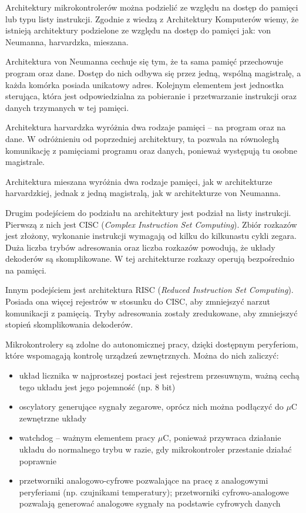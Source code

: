 Architektury mikrokontrolerów można podzielić ze względu na dostęp do pamięci lub typu listy instrukcji. Zgodnie z wiedzą z Architektury Komputerów wiemy, że istnieją architektury podzielone ze względu na dostęp do pamięci jak: von Neumanna, harvardzka, mieszana.

Architektura von Neumanna cechuje się tym, że ta sama pamięć przechowuje program oraz dane. Dostęp do nich odbywa się przez jedną, wspólną magistralę, a każda komórka posiada unikatowy adres. Kolejnym elementem jest jednostka sterująca, która jest odpowiedzialna za pobieranie i przetwarzanie instrukcji oraz danych trzymanych w tej pamięci.

Architektura harvardzka wyróżnia dwa rodzaje pamięci -- na program oraz na dane. W odróżnieniu od poprzedniej architektury, ta pozwala na równoległą komunikację z pamięciami programu oraz danych, ponieważ występują tu osobne magistrale.

Architektura mieszana wyróżnia dwa rodzaje pamięci, jak w architekturze harvardzkiej, jednak z jedną magistralą, jak w architekturze von Neumanna.

Drugim podejściem do podziału na architektury jest podział na listy instrukcji. Pierwszą z nich jest CISC (\textit{Complex Instruction Set Computing}). Zbiór rozkazów jest złożony, wykonanie instrukcji wymagają od kilku do kilkunastu cykli zegara. Duża liczba trybów adresowania oraz liczba rozkazów powodują, że układy dekoderów są skomplikowane. W tej architekturze rozkazy operują bezpośrednio na pamięci.

Innym podejściem jest architektura RISC (\textit{Reduced Instruction Set Computing}). Posiada ona więcej rejestrów w stosunku do CISC, aby zmniejszyć narzut komunikacji z pamięcią. Tryby adresowania zostały zredukowane, aby zmniejszyć stopień skomplikowania dekoderów. 

Mikrokontrolery są zdolne do autonomicznej pracy, dzięki dostępnym peryferiom, które wspomagają kontrolę urządzeń zewnętrznych. Można do nich zaliczyć:
\begin{itemize}
\item układ licznika w najprostszej postaci jest rejestrem przesuwnym, ważną cechą tego układu jest jego pojemność (np. 8 bit)
\item oscylatory generujące sygnały zegarowe, oprócz nich można podłączyć do $\mu$C zewnętrzne układy
\item watchdog -- ważnym elementem pracy $\mu$C, ponieważ przywraca działanie układu do normalnego trybu w razie, gdy mikrokontroler przestanie działać poprawnie
\item przetworniki analogowo-cyfrowe pozwalające na pracę z analogowymi peryferiami (np. czujnikami temperatury); przetworniki cyfrowo-analogowe pozwalają generować analogowe sygnały na podstawie cyfrowych danych
\end{itemize}

